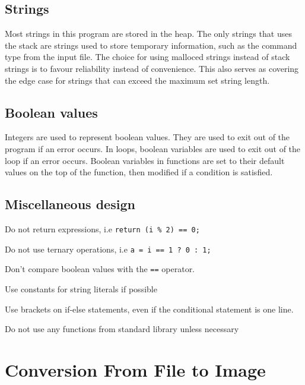 \documentclass[a4paper, 12pt, titlepage]{article}
\newcommand{\code}[1]{\small\texttt{#1}\normalsize}
\begin{document}
\subsection{Strings}

Most strings in this program are stored in the heap. The only strings 
that uses the stack are strings used to store temporary information, 
such as the command type from the input file. The choice for using 
malloced strings instead of stack strings is to favour reliability 
instead of convenience. This also serves as covering the edge case 
for strings that can exceed the maximum set string length.

\subsection{Boolean values}

Integers are used to represent boolean values. They are used to exit 
out of the program if an error occurs. In loops, boolean variables are 
used to exit out of the loop if an error occurs. Boolean variables in 
functions are set to their default values on the top of the function, then 
modified if a condition is satisfied.

\subsection{Miscellaneous design}

\begin{itemize}[label={--}]
\begin{samepage}
    \item Do not return expressions, i.e \code{return (i \% 2) == 0;}
    \item Do not use ternary operations, i.e \code{a = i == 1 ? 0 : 1;}
    \item Don't compare boolean values with the \code{==} operator.
    \item Use constants for string literals if possible
    \item Use brackets on if-else statements, even if the conditional 
          statement is one line.
    \item Do not use any functions from standard library unless necessary
\end{samepage}
\end{itemize}

\newpage


\section{Conversion From File to Image}
\end{document}
